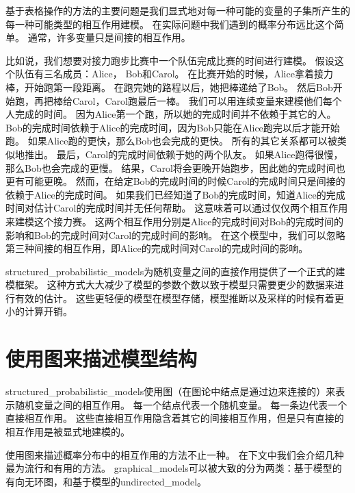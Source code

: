基于表格操作的方法的主要问题是我们显式地对每一种可能的变量的子集所产生的每一种可能类型的相互作用建模。
在实际问题中我们遇到的概率分布远比这个简单。
通常，许多变量只是间接的相互作用。


比如说，我们想要对接力跑步比赛中一个队伍完成比赛的时间进行建模。
假设这个队伍有三名成员：Alice， Bob和Carol。
在比赛开始的时候，Alice拿着接力棒，开始跑第一段距离。
在跑完她的路程以后，她把棒递给了Bob。
然后Bob开始跑，再把棒给Carol，Carol跑最后一棒。
我们可以用连续变量来建模他们每个人完成的时间。
因为Alice第一个跑，所以她的完成时间并不依赖于其它的人。
Bob的完成时间依赖于Alice的完成时间，因为Bob只能在Alice跑完以后才能开始跑。
如果Alice跑的更快，那么Bob也会完成的更快。
所有的其它关系都可以被类似地推出。
最后，Carol的完成时间依赖于她的两个队友。
如果Alice跑得很慢，那么Bob也会完成的更慢。
结果，Carol将会更晚开始跑步，因此她的完成时间也更有可能更晚。
然而，在给定Bob的完成时间的时候Carol的完成时间只是间接的依赖于Alice的完成时间。
如果我们已经知道了Bob的完成时间，知道Alice的完成时间对估计Carol的完成时间并无任何帮助。
这意味着可以通过仅仅两个相互作用来建模这个接力赛。
这两个相互作用分别是Alice的完成时间对Bob的完成时间的影响和Bob的完成时间对Carol的完成时间的影响。
在这个模型中，我们可以忽略第三种间接的相互作用，即Alice的完成时间对Carol的完成时间的影响。


\gls{structured_probabilistic_models}为随机变量之间的直接作用提供了一个正式的建模框架。
这种方式大大减少了模型的参数个数以致于模型只需要更少的数据来进行有效的估计。
这些更轻便的模型在模型存储，模型推断以及采样的时候有着更小的计算开销。


\section{使用图来描述模型结构}
\label{sec:using_graphs_to_describe_model_structure}


\gls{structured_probabilistic_models}使用图（在图论中结点是通过边来连接的）来表示随机变量之间的相互作用。
每一个结点代表一个随机变量。
每一条边代表一个直接相互作用。
这些直接相互作用隐含着其它的间接相互作用，但是只有直接的相互作用是被显式地建模的。


使用图来描述概率分布中的相互作用的方法不止一种。
在下文中我们会介绍几种最为流行和有用的方法。
\gls{graphical_models}可以被大致的分为两类：基于模型的有向无环图，和基于模型的\gls{undirected_model}。


\subsection{}
\label{sec:directed_models}


